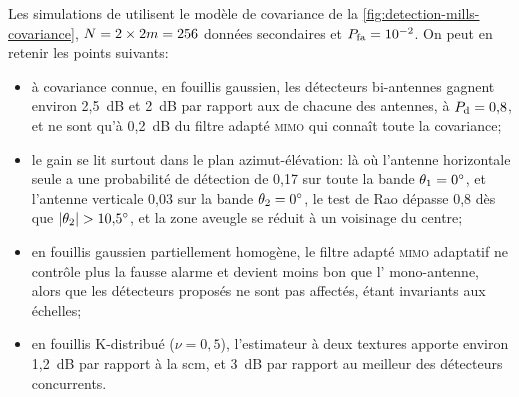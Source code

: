 Les simulations de \cite{JOE24} utilisent le modèle de covariance de la \cref{fig:detection-mills-covariance}, $N=2\times2m=256$ données secondaires et $P_{\mathrm{fa}}=10^{-2}$. On peut en retenir les points suivants:
\begin{itemize}
  \item à covariance connue, en fouillis gaussien, les détecteurs bi-antennes gagnent environ 2,5~dB et 2~dB par rapport aux  de chacune des antennes, à $P_{\mathrm{d}}=0{,}8$, et ne sont qu'à 0,2~dB du filtre adapté \textsc{mimo} qui connaît toute la covariance;
  \item le gain se lit surtout dans le plan azimut-élévation: là où l'antenne horizontale seule a une probabilité de détection de 0,17 sur toute la bande $\theta_1=0^\circ$, et l'antenne verticale 0,03 sur la bande $\theta_2=0^\circ$, le test de Rao dépasse 0,8 dès que $\left\lvert\theta_2\right\rvert>10{,}5^\circ$, et la zone aveugle se réduit à un voisinage du centre;
  \item en fouillis gaussien partiellement homogène, le filtre adapté \textsc{mimo} adaptatif ne contrôle plus la fausse alarme et devient moins bon que l' mono-antenne, alors que les détecteurs proposés ne sont pas affectés, étant invariants aux échelles;
  \item en fouillis K-distribué ($\nu=0{,}5$), l'estimateur à deux textures apporte environ 1,2~dB par rapport à la scm, et 3~dB par rapport au meilleur des détecteurs concurrents.
\end{itemize}

